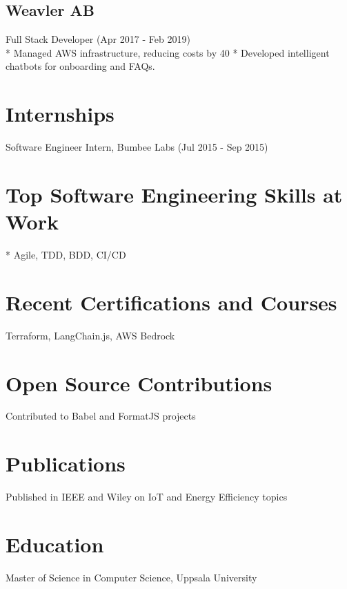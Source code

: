 \documentclass[13pt,a4paper,sans,colorlinks,urlcolor=violet,hyperindex,plainpages=false,bookmarksopen,bookmarksnumbered,pdfusetitle]{moderncv}
\begin{document}
\begin{paracol}{2}
\vspace{0.5em}

\subsection{Weavler AB}
Full Stack Developer (Apr 2017 - Feb 2019) \\
* Managed AWS infrastructure, reducing costs by 40%
* Developed intelligent chatbots for onboarding and FAQs.

\section{Internships}
Software Engineer Intern, Bumbee Labs (Jul 2015 - Sep 2015)

\section{Top Software Engineering Skills at \textbf{Work}}
* Agile, TDD, BDD, CI/CD

\section{Recent Certifications and Courses}
Terraform, LangChain.js, AWS Bedrock

\section{Open Source Contributions}
Contributed to Babel and FormatJS projects

\section{Publications}
Published in IEEE and Wiley on IoT and Energy Efficiency topics

\section{Education}
Master of Science in Computer Science, Uppsala University

\end{paracol}
\end{document}
